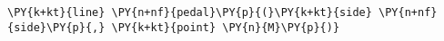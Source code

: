 \begin{Verbatim}[commandchars=\\\{\}]
    \PY{k+kt}{line} \PY{n+nf}{pedal}\PY{p}{(}\PY{k+kt}{side} \PY{n+nf}{side}\PY{p}{,} \PY{k+kt}{point} \PY{n}{M}\PY{p}{)}
\end{Verbatim}
